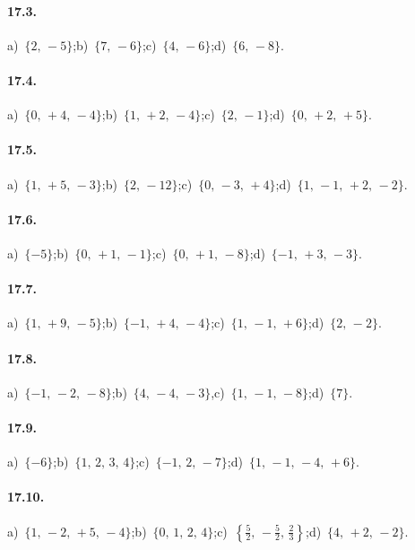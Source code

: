 \paragraph{17.3.}
a)~$\{2\text{,~}-5\}$;\quad b)~$\{7\text{,~}-6\}$;\quad c)~$\{4\text{,~}-6\}$;\quad d)~$\{6\text{,~}-8\}$.
\paragraph{17.4.}
a)~$\{0\text{,~}+4\text{,~}-4\}$;\quad b)~$\{1\text{,~}+2\text{,~}-4\}$;\quad c)~$\{2\text{,~}-1\}$;\quad d)~$\{0\text{,~}+2\text{,~}+5\}$.
\paragraph{17.5.}
a)~$\{1\text{,~}+5\text{,~}-3\}$;\quad b)~$\{2\text{,~}-12\}$;\quad c)~$\{0\text{,~}-3\text{,~}+4\}$;\quad d)~$\{1\text{,~}-1\text{,~}+2\text{,~}-2\}$.
\paragraph{17.6.}
a)~$\{-5\}$;\quad b)~$\{0\text{,~}+1\text{,~}-1\}$;\quad c)~$\{0\text{,~}+1\text{,~}-8\}$;\quad d)~$\{-1\text{,~}+3\text{,~}-3\}$.
\paragraph{17.7.}
a)~$\{1\text{,~}+9\text{,~}-5\}$;\quad b)~$\{-1\text{,~}+4\text{,~}-4\}$;\quad c)~$\{1\text{,~}-1\text{,~}+6\}$;\quad d)~$\{2\text{,~}-2\}$.
\paragraph{17.8.}
a)~$\{-1\text{,~}-2\text{,~}-8\}$;\quad b)~$\{4\text{,~}-4\text{,~}-3\}$,\quad c)~$\{1\text{,~}-1\text{,~}-8\}$;\quad d)~$\{7\}$.
\paragraph{17.9.}
a)~$\{-6\}$;\quad b)~$\{1\text{,~}2\text{,~}3\text{,~}4\}$;\quad c)~$\{-1\text{,~}2\text{,~}-7\}$;\quad d)~$\{1\text{,~}-1\text{,~}-4\text{,~}+6\}$.

\paragraph{17.10.}
a)~$\{1\text{,~}-2\text{,~}+5\text{,~}-4\}$;\quad b)~$\{0\text{,~}1\text{,~}2\text{,~}4\}$;\quad c)~$\left\{\frac{5}{2}\text{,~}-\frac{5}{2}\text{,~}\frac{2}{3}\right\}$;\quad d)~$\{4\text{,~}+2\text{,~}-2\}$.

